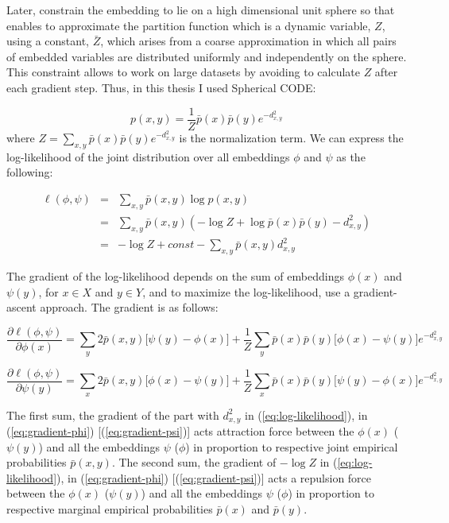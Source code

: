 Later, \citet{Maron2010} constrain the embedding to lie on a high dimensional
unit sphere so that enables to approximate the partition function which is a dynamic variable, $Z$, using a constant, $\bar{Z}$, which arises from a coarse approximation in which all pairs of embedded variables are distributed uniformly and independently on the sphere. This constraint allows to work on large datasets by avoiding to calculate $Z$ after each gradient step. Thus, in this thesis I used Spherical CODE:

\begin{equation} \label{eq:marginal-marginal-model}
  p(x,y) = \frac{1}{Z} \bar{p}(x) \bar{p}(y) e^{-d^2_{x,y}}
\end{equation}
where $Z = \sum_{x,y} \bar{p}(x) \bar{p}(y) e^{-d^2_{x,y}}$ is the
normalization term.  We can express the log-likelihood of the joint
distribution over all embeddings $\phi$ and $\psi$ as the following:

\begin{eqnarray} \label{eq:log-likelihood}
  \ell(\phi,\psi) & = & \sum_{x,y} \bar{p}(x,y) \log p(x,y) \nonumber \\
  & = & \sum_{x,y} \bar{p}(x,y) (-\log Z + \log \bar{p}(x) \bar{p}(y) - d^2_{x,y}) \nonumber \\
  & = & -\log Z + const - \sum_{x,y} \bar{p}(x,y) d^2_{x,y}
\end{eqnarray}

The gradient of the log-likelihood depends on the sum of embeddings
$\phi(x)$ and $\psi(y)$, for $x \in X$ and $y \in Y$, and to maximize
the log-likelihood, \cite{Maron2010} use a gradient-ascent
approach. The gradient is as follows:

\begin{equation} \label{eq:gradient-phi}
  \frac{\partial \ell(\phi,\psi)}{\partial \phi(x)} =%
  \sum_{y} 2 \bar{p}(x,y) {[}\psi(y) - \phi(x){]} +%
  \frac{1}{Z} \sum_{y} \bar{p}(x) \bar{p}(y) {[}\phi(x) - \psi(y){]} e^{-d^2_{x,y}}
\end{equation}

\begin{equation} \label{eq:gradient-psi}
  \frac{\partial \ell(\phi,\psi)}{\partial \psi(y)} =%
  \sum_{x} 2 \bar{p}(x,y) {[}\phi(x) - \psi(y){]} +%
  \frac{1}{Z} \sum_{x} \bar{p}(x) \bar{p}(y) {[}\psi(y) - \phi(x){]} e^{-d^2_{x,y}}
\end{equation}

The first sum, the gradient of the part with $d^2_{x,y}$ in
(\ref{eq:log-likelihood}), in (\ref{eq:gradient-phi})
{[}(\ref{eq:gradient-psi}){]} acts attraction force between the
$\phi(x)$ ($\psi(y)$) and all the embeddings $\psi$ ($\phi$) in
proportion to respective joint empirical probabilities $\bar{p}(x,y)$. The second sum, the gradient of $-\log Z$ in
(\ref{eq:log-likelihood}), in (\ref{eq:gradient-phi})
{[}(\ref{eq:gradient-psi}){]} acts a repulsion force between the
$\phi(x)$ ($\psi(y)$) and all the embeddings $\psi$ ($\phi$) in
proportion to respective marginal empirical probabilities $\bar{p}(x)$
and $\bar{p}(y)$. \\

